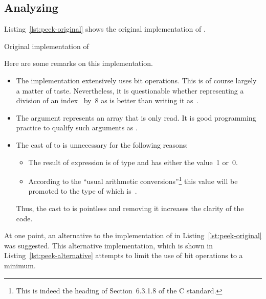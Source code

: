 \subsection{Analyzing \peek}
\label{sec:bitwalker-peek-first-look}

Listing~\ref{lst:peek-original} shows the original implementation of \peek.


\begin{listing}[hbt]
\begin{minipage}{\textwidth}

\end{minipage}
\caption{\label{lst:peek-original} Original implementation of \peek}
\end{listing}

Here are some remarks on this implementation.

\begin{itemize}
\item The implementation extensively uses bit operations.
      This is of course largely a matter of taste.
      Nevertheless, it is questionable whether representing a division 
      of an index~ by~8 as  is better than writing it as~.
\item The argument  represents an array that is only read.
      It is good programming practice to qualify such arguments as .

\item The cast of  to  is unnecessary for the following reasons:
\begin{itemize}
\item The result of expression  is of type  and has either the value~1 or~0.
\item According to the ``usual arithmetic conversions''\footnote{%
     This is indeed the heading of Section~6.3.1.8 of the C standard.
}
this value will be promoted to the type of  which is~.
\end{itemize}

    Thus, the cast to  is pointless and removing it increases the clarity of the code.

\end{itemize}

At one point, an alternative to the implementation of \peek in
Listing~\ref{lst:peek-original} was suggested.
This alternative implementation, which is shown in Listing~\ref{lst:peek-alternative}
attempts to limit the use of bit operations to a minimum.


